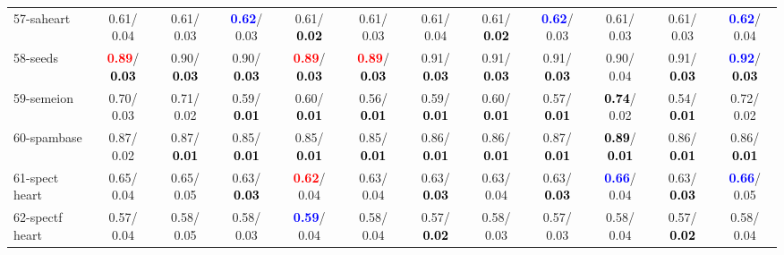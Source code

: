 \begin{table}[h]
\begin{center}
{\begin{tabular}{lc|c|c|c|c|c|c|c|c|c|c}
57-saheart &   0.61/  0.04 &   0.61/  0.03 & \textcolor{blue}{\textbf{  0.62}}/  0.03 &   0.61/\textcolor{black}{\textbf{  0.02}} &   0.61/  0.03 &   0.61/  0.04 &   0.61/\textcolor{black}{\textbf{  0.02}} & \textcolor{blue}{\textbf{  0.62}}/  0.03 &   0.61/  0.03 &   0.61/  0.03 & \textcolor{blue}{\textbf{  0.62}}/  0.04 \\
58-seeds & \textcolor{red}{\textbf{  0.89}}/\textcolor{black}{\textbf{  0.03}} &   0.90/\textcolor{black}{\textbf{  0.03}} &   0.90/\textcolor{black}{\textbf{  0.03}} & \textcolor{red}{\textbf{  0.89}}/\textcolor{black}{\textbf{  0.03}} & \textcolor{red}{\textbf{  0.89}}/\textcolor{black}{\textbf{  0.03}} &   0.91/\textcolor{black}{\textbf{  0.03}} &   0.91/\textcolor{black}{\textbf{  0.03}} &   0.91/\textcolor{black}{\textbf{  0.03}} &   0.90/  0.04 &   0.91/\textcolor{black}{\textbf{  0.03}} & \textcolor{blue}{\textbf{  0.92}}/\textcolor{black}{\textbf{  0.03}} \\
59-semeion &   0.70/  0.03 &   0.71/  0.02 &   0.59/\textcolor{black}{\textbf{  0.01}} &   0.60/\textcolor{black}{\textbf{  0.01}} &   0.56/\textcolor{black}{\textbf{  0.01}} &   0.59/\textcolor{black}{\textbf{  0.01}} &   0.60/\textcolor{black}{\textbf{  0.01}} &   0.57/\textcolor{black}{\textbf{  0.01}} & \textcolor{black}{\textbf{  0.74}}/  0.02 &   0.54/\textcolor{black}{\textbf{  0.01}} &   0.72/  0.02 \\
60-spambase &   0.87/  0.02 &   0.87/\textcolor{black}{\textbf{  0.01}} &   0.85/\textcolor{black}{\textbf{  0.01}} &   0.85/\textcolor{black}{\textbf{  0.01}} &   0.85/\textcolor{black}{\textbf{  0.01}} &   0.86/\textcolor{black}{\textbf{  0.01}} &   0.86/\textcolor{black}{\textbf{  0.01}} &   0.87/\textcolor{black}{\textbf{  0.01}} & \textcolor{black}{\textbf{  0.89}}/\textcolor{black}{\textbf{  0.01}} &   0.86/\textcolor{black}{\textbf{  0.01}} &   0.86/\textcolor{black}{\textbf{  0.01}} \\ \hline
61-spect heart &   0.65/  0.04 &   0.65/  0.05 &   0.63/\textcolor{black}{\textbf{  0.03}} & \textcolor{red}{\textbf{  0.62}}/  0.04 &   0.63/  0.04 &   0.63/\textcolor{black}{\textbf{  0.03}} &   0.63/  0.04 &   0.63/\textcolor{black}{\textbf{  0.03}} & \textcolor{blue}{\textbf{  0.66}}/  0.04 &   0.63/\textcolor{black}{\textbf{  0.03}} & \textcolor{blue}{\textbf{  0.66}}/  0.05 \\
62-spectf heart &   0.57/  0.04 &   0.58/  0.05 &   0.58/  0.03 & \textcolor{blue}{\textbf{  0.59}}/  0.04 &   0.58/  0.04 &   0.57/\textcolor{black}{\textbf{  0.02}} &   0.58/  0.03 &   0.57/  0.03 &   0.58/  0.04 &   0.57/\textcolor{black}{\textbf{  0.02}} &   0.58/  0.04 \\

\end{tabular}}
\end{center}
\end{table}
